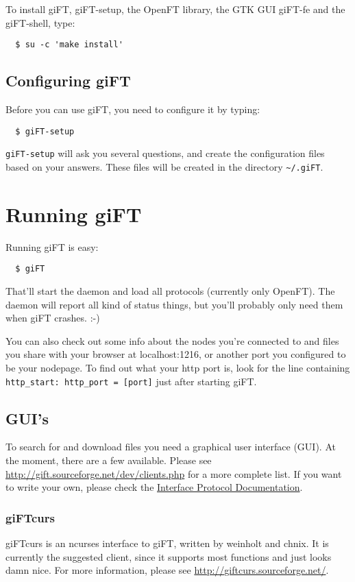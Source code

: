 \documentclass[10pt]{article}
\begin{document}
To install giFT, giFT-setup, the OpenFT library, the GTK GUI giFT-fe and the
giFT-shell, type:

\begin{verbatim}
  $ su -c 'make install'
\end{verbatim}

\subsection{Configuring giFT}

Before you can use giFT, you need to configure it by typing:

\begin{verbatim}
  $ giFT-setup
\end{verbatim}

\texttt{giFT-setup} will ask you several questions, and create the configuration 
files based on your answers.  
These files will be created in the directory \texttt{\~{}/.giFT}.


\section{Running giFT}
Running giFT is easy:

\begin{verbatim}
  $ giFT
\end{verbatim}

That'll start the daemon and load all protocols (currently only OpenFT).
The daemon will report all kind of status things, but you'll probably only
need them when giFT crashes. :-)

You can also check out some info about the nodes you're connected to and files
you share with your browser at localhost:1216, or another port you configured
to be your nodepage. To find out what your http port is, look for the line
containing \verb|http_start: http_port = [port]| just after starting giFT.

\subsection{GUI's}
To search for and download files you need a graphical user interface (GUI).  At
the moment, there are a few available. Please see
\url{http://gift.sourceforge.net/dev/clients.php} for a more complete list. If
you want to write your own, please check the
\href{http://gift.sourceforge.net/docs/?document=interface.html}{Interface
Protocol Documentation}.

\subsubsection{giFTcurs}
giFTcurs is an ncurses interface to giFT, written by weinholt and chnix. 
It is currently the suggested client, since it supports most functions and 
just looks damn nice. For more information, please see
\url{http://giftcurs.sourceforge.net/}. 
\end{document}
